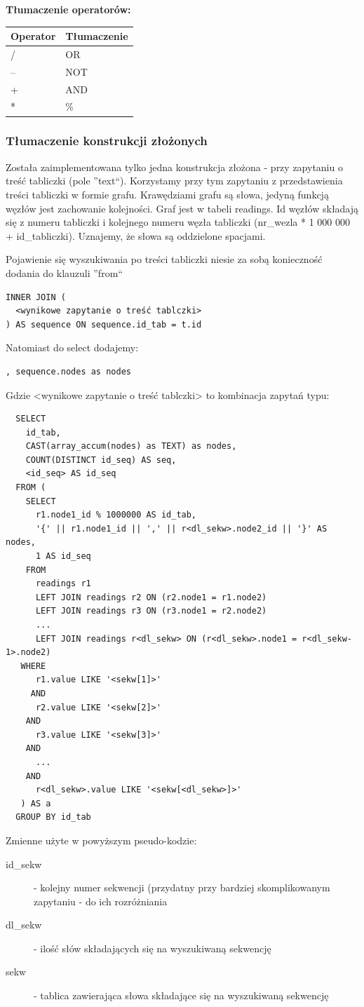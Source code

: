 \documentclass{pracamgr}
\begin{document}
\textbf{Tłumaczenie operatorów:}
\begin{longtable}{|p{1in}|p{1in}|}
\hline
{\bf Operator} & {\bf Tłumaczenie}\\
\hline
\endhead
/ & OR\\ 
\hline
-- & NOT\\ 
\hline
+ & AND\\ 
\hline
* & \%  \\ 
\hline
\end{longtable}


\subsubsection{Tłumaczenie konstrukcji złożonych}
Została zaimplementowana tylko jedna konstrukcja złożona - przy zapytaniu o treść tabliczki (pole ''text``).
Korzystamy przy tym zapytaniu z przedstawienia treści tabliczki w formie grafu. 
Krawędziami grafu są słowa, jedyną funkcją węzłów jest zachowanie kolejności. 
Graf jest w tabeli readings.
Id węzłów składają się z numeru tabliczki i kolejnego numeru węzła tabliczki (nr\_wezla * 1 000 000 + id\_tabliczki). 
Uznajemy, że słowa są oddzielone spacjami.

Pojawienie się wyszukiwania po treści tabliczki niesie za sobą konieczność dodania do klauzuli ''from`` 
\begin{verbatim}
INNER JOIN (
  <wynikowe zapytanie o treść tablczki>
) AS sequence ON sequence.id_tab = t.id
\end{verbatim}

Natomiast do select dodajemy:
\begin{verbatim}
, sequence.nodes as nodes
\end{verbatim}

Gdzie <wynikowe zapytanie o treść tablczki> to kombinacja zapytań typu:
\begin{verbatim}
  SELECT 
    id_tab, 
    CAST(array_accum(nodes) as TEXT) as nodes, 
    COUNT(DISTINCT id_seq) AS seq, 
    <id_seq> AS id_seq
  FROM (
    SELECT
      r1.node1_id % 1000000 AS id_tab,
      '{' || r1.node1_id || ',' || r<dl_sekw>.node2_id || '}' AS nodes,
      1 AS id_seq
    FROM
      readings r1
      LEFT JOIN readings r2 ON (r2.node1 = r1.node2)
      LEFT JOIN readings r3 ON (r3.node1 = r2.node2)
      ...
      LEFT JOIN readings r<dl_sekw> ON (r<dl_sekw>.node1 = r<dl_sekw-1>.node2)
   WHERE
      r1.value LIKE '<sekw[1]>'
     AND
      r2.value LIKE '<sekw[2]>'
    AND
      r3.value LIKE '<sekw[3]>'
    AND
      ...
    AND
      r<dl_sekw>.value LIKE '<sekw[<dl_sekw>]>'
   ) AS a 
  GROUP BY id_tab
\end{verbatim}
Zmienne użyte w powyższym pseudo-kodzie:
\begin{description}
 \item[id\_sekw] - kolejny numer sekwencji (przydatny przy bardziej skomplikowanym zapytaniu - do ich rozróżniania
 \item[dl\_sekw] - ilość słów składających się na wyszukiwaną sekwencję
 \item[sekw] - tablica zawierająca słowa składające się na wyszukiwaną sekwencję
 \end{description}
\end{document}
